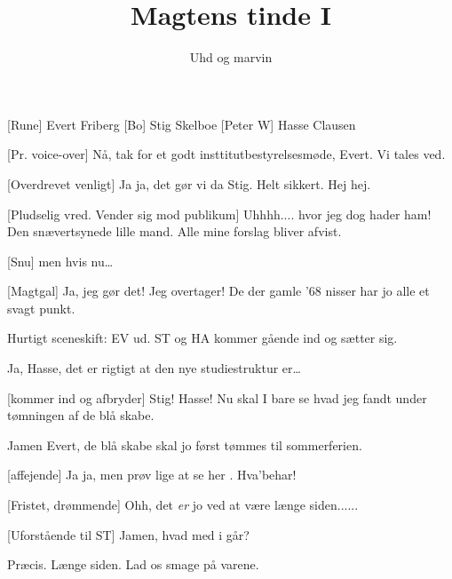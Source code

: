 \documentclass[a4paper,11pt]{article}
\title{Magtens tinde I}
\author{Uhd og marvin}
\begin{document}
\maketitle

\begin{roles}
  [Rune] Evert Friberg
  [Bo] Stig Skelboe
  [Peter W] Hasse Clausen
\end{roles}

\begin{props}
\end{props}

  
\begin{sketch}

[Pr. voice-over] Nå, tak for et godt
insttitutbestyrelsesmøde, Evert. Vi tales ved.

[Overdrevet venligt] Ja ja, det gør vi da Stig. Helt
sikkert.  Hej hej. 

[Pludselig vred. Vender sig mod publikum] Uhhhh.... hvor jeg
dog hader ham! Den snævertsynede lille mand.  Alle mine forslag bliver afvist.

[Snu] men hvis nu\ldots


[Magtgal] Ja, jeg gør det! Jeg overtager! De der gamle '68
nisser har jo alle et svagt punkt.

\scene Hurtigt sceneskift: EV ud. ST og HA kommer gående ind og sætter sig.

 Ja, Hasse, det er rigtigt at den nye studiestruktur er\ldots

[kommer ind og afbryder] Stig! Hasse! Nu skal I bare se hvad jeg fandt
under tømningen af de blå skabe.

 Jamen Evert, de blå skabe skal jo først tømmes til
sommerferien.

[affejende] Ja ja, men prøv lige at se her . Hva'behar! 

[Fristet, drømmende] Ohh, det \textit{er} jo ved at være
længe siden......

[Uforstående til ST] Jamen, hvad med i går?

 Præcis. Længe siden. Lad os smage på varene.

\end{sketch}
\end{document}
